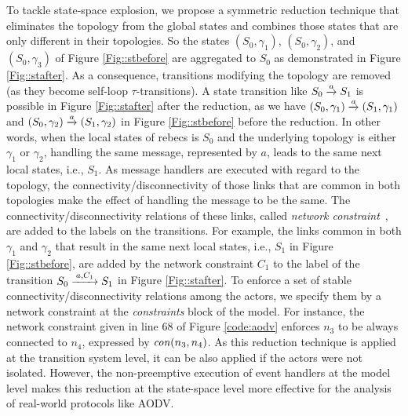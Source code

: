 To tackle state-space explosion, we propose a symmetric reduction technique that eliminates the topology from the global states and combines those states that are only different in their topologies.  So the states $(S_0,\gamma_1)$, $(S_0,\gamma_2)$, and $(S_0,\gamma_3)$ of Figure \ref{Fig::stbefore} are aggregated to $S_0$ as demonstrated in Figure \ref{Fig::stafter}. As a consequence, transitions modifying the topology are removed (as they become self-loop $\tau$-transitions). 
A state transition like $S_0\overto{a} S_1$ is possible in Figure \ref{Fig::stafter} after the reduction, as we have $(S_0,\gamma_1)\overto{a}(S_1,\gamma_1)$ and $(S_0,\gamma_2)\overto{a}(S_1,\gamma_2)$ in Figure \ref{Fig::stbefore} before the reduction. In other words, when the local states of rebecs is $S_0$ and the underlying topology is either $\gamma_1$ or $\gamma_2$, handling the same message, represented by $a$, leads to the same next local states, i.e., $S_1$.  As message handlers are executed with regard to the topology, the connectivity/disconnectivity of those links that are common in both topologies make the effect of handling the message to be the same. The connectivity/disconnectivity relations of these links, called \emph{network constraint}~\cite{FatemehFI10,FatemehFI19},  are added to the labels on the transitions. For example, the links common in both $\gamma_{1}$ and $\gamma_{2}$ that result in the same next local states, i.e., $S_1$ in Figure \ref{Fig::stbefore}, are added by the network constraint $C_1$ to the label of the transition $S_0\overto{a,C_1}S_1$ in Figure \ref{Fig::stafter}. %
To enforce a set of stable connectivity/disconnectivity relations among the actors, we specify them by a network constraint at the \emph{constraints} block of the model. For instance, the network constraint given in line $68$ of Figure \ref{code:aodv} enforces $n_3$ to be always connected to $n_4$, expressed by ${\it con}(n_3,n_4)$.  
As this reduction technique is applied at the transition system level,
it can be also applied if the actors were not isolated. However, the non-preemptive execution of event handlers at the model level makes this reduction at the state-space level more effective for the analysis of real-world protocols like AODV. 

